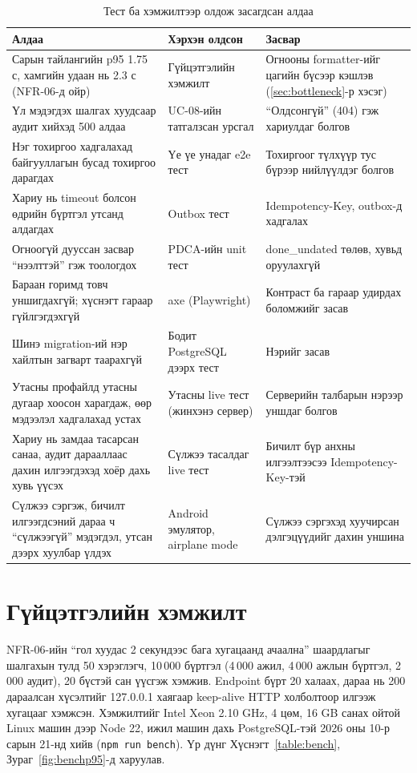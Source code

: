 \begin{table}[H]
\centering
\caption{Тест ба хэмжилтээр олдож засагдсан алдаа}
\label{table:bugs}
\begin{tabular}{|L{5.8cm}|L{3.4cm}|L{5.2cm}|}
\hline
\textbf{Алдаа} & \textbf{Хэрхэн олдсон} & \textbf{Засвар} \\ \hline
Сарын тайлангийн p95 1.75 с, хамгийн удаан нь 2.3 с (NFR-06-д ойр) & Гүйцэтгэлийн хэмжилт & Огнооны formatter-ийг цагийн бүсээр кэшлэв (\ref{sec:bottleneck}-р хэсэг) \\ \hline
Үл мэдэгдэх шалгах хуудсаар аудит хийхэд 500 алдаа & UC-08-ийн татгалзсан урсгал & ``Олдсонгүй'' (404) гэж хариулдаг болгов \\ \hline
Нэг тохиргоо хадгалахад байгууллагын бусад тохиргоо дарагдах & Үе үе унадаг e2e тест & Тохиргоог түлхүүр тус бүрээр нийлүүлдэг болгов \\ \hline
Хариу нь timeout болсон өдрийн бүртгэл утсанд алдагдах & Outbox тест & Idempotency-Key, outbox-д хадгалах \\ \hline
Огноогүй дууссан засвар ``нээлттэй'' гэж тоологдох & PDCA-ийн unit тест & done\_undated төлөв, хувьд оруулахгүй \\ \hline
Бараан горимд товч уншигдахгүй; хүснэгт гараар гүйлгэгдэхгүй & axe (Playwright) & Контраст ба гараар удирдах боломжийг засав \\ \hline
Шинэ migration-ий нэр хайлтын загварт таарахгүй & Бодит PostgreSQL дээрх тест & Нэрийг засав \\ \hline
Утасны профайлд утасны дугаар хоосон харагдаж, өөр мэдээлэл хадгалахад устах & Утасны live тест (жинхэнэ сервер) & Серверийн талбарын нэрээр уншдаг болгов \\ \hline
Хариу нь замдаа тасарсан санаа, аудит дарааллаас дахин илгээгдэхэд хоёр дахь хувь үүсэх & Сүлжээ тасалдаг live тест & Бичилт бүр анхны илгээлтээсээ Idempotency-Key-тэй \\ \hline
Сүлжээ сэргэж, бичилт илгээгдсэний дараа ч ``сүлжээгүй'' мэдэгдэл, утсан дээрх хуулбар үлдэх & Android эмулятор, airplane mode & Сүлжээ сэргэхэд хуучирсан дэлгэцүүдийг дахин уншина \\ \hline
\end{tabular}
\end{table}

\section{Гүйцэтгэлийн хэмжилт}
\label{sec:benchmark}
NFR-06-ийн ``гол хуудас 2 секундээс бага хугацаанд ачаална'' шаардлагыг шалгахын тулд 50 хэрэглэгч, 10\,000 бүртгэл (4\,000 ажил, 4\,000 ажлын бүртгэл, 2\,000 аудит), 20 бүстэй сан үүсгэж хэмжив. Endpoint бүрт 20 халаах, дараа нь 200 дараалсан хүсэлтийг 127.0.0.1 хаягаар keep-alive HTTP холболтоор илгээж хугацааг хэмжсэн. Хэмжилтийг Intel Xeon 2.10 GHz, 4 цөм, 16 GB санах ойтой Linux машин дээр Node 22, ижил машин дахь PostgreSQL-тэй 2026 оны 10-р сарын 21-нд хийв (\texttt{npm run bench}). Үр дүнг Хүснэгт~\ref{table:bench}, Зураг~\ref{fig:benchp95}-д харуулав.

